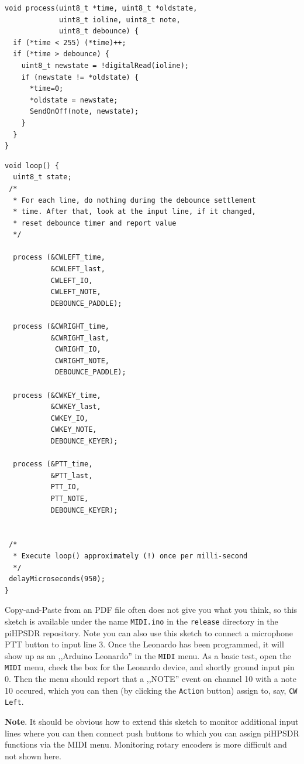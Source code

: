 \documentclass[12pt]{book}
\def\rett#1{\texttt{\color{red}#1}}
\def\bltt#1{\texttt{\color{blue}#1}}
\begin{document}
\begin{small}
\begin{verbatim}
void process(uint8_t *time, uint8_t *oldstate,
             uint8_t ioline, uint8_t note,
             uint8_t debounce) {
  if (*time < 255) (*time)++;
  if (*time > debounce) {
    uint8_t newstate = !digitalRead(ioline);
    if (newstate != *oldstate) {
      *time=0;
      *oldstate = newstate;
      SendOnOff(note, newstate);
    }
  }
}
\end{verbatim}
\clearpage
\begin{verbatim}
void loop() {
  uint8_t state;
 /*
  * For each line, do nothing during the debounce settlement
  * time. After that, look at the input line, if it changed,
  * reset debounce timer and report value
  */

  process (&CWLEFT_time,
           &CWLEFT_last,
           CWLEFT_IO,
           CWLEFT_NOTE,
           DEBOUNCE_PADDLE);

  process (&CWRIGHT_time,
           &CWRIGHT_last,
            CWRIGHT_IO,
            CWRIGHT_NOTE,
            DEBOUNCE_PADDLE);

  process (&CWKEY_time,
           &CWKEY_last,
           CWKEY_IO,
           CWKEY_NOTE,
           DEBOUNCE_KEYER);

  process (&PTT_time,
           &PTT_last,
           PTT_IO,
           PTT_NOTE,
           DEBOUNCE_KEYER);


 /*
  * Execute loop() approximately (!) once per milli-second
  */
 delayMicroseconds(950);
}
\end{verbatim}
\end{small}
\clearpage
Copy-and-Paste from an PDF file often does not give you what you think, so
this sketch is available under the name \texttt{MIDI.ino} in the \texttt{release}
directory in the piHPSDR repository. Note you can
also use this sketch to connect a microphone PTT button to input line 3. Once the
Leonardo has been programmed,
it will show up as an ,,Arduino Leonardo'' in the \bltt{MIDI} menu. As a basic test,
open the \bltt{MIDI} menu, check the box for the Leonardo device,
 and shortly ground input pin 0. Then the menu should report
that a ,,NOTE'' event on channel 10 with a note 10 occured, which you can then
(by clicking the \rett{Action} button) assign to, say, \bltt{CW Left}.

\textbf{Note}. It should be obvious how to extend this sketch to monitor additional
input lines where you can then connect push buttons to which you can assign piHPSDR
functions via the MIDI menu. Monitoring rotary encoders is more difficult and not
shown here.
\end{document}
